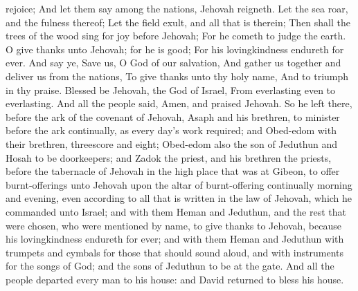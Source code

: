 rejoice; And let them say among the nations, Jehovah reigneth.  Let the sea roar, and the fulness thereof; Let the field exult, and all that is therein;  Then shall the trees of the wood sing for joy before Jehovah; For he cometh to judge the earth.  O give thanks unto Jehovah; for he is good; For his lovingkindness endureth for ever.  And say ye, Save us, O God of our salvation, And gather us together and deliver us from the nations, To give thanks unto thy holy name, And to triumph in thy praise.  Blessed be Jehovah, the God of Israel, From everlasting even to everlasting. And all the people said, Amen, and praised Jehovah.  So he left there, before the ark of the covenant of Jehovah, Asaph and his brethren, to minister before the ark continually, as every day’s work required; and Obed-edom with their brethren, threescore and eight; Obed-edom also the son of Jeduthun and Hosah to be doorkeepers; and Zadok the priest, and his brethren the priests, before the tabernacle of Jehovah in the high place that was at Gibeon, to offer burnt-offerings unto Jehovah upon the altar of burnt-offering continually morning and evening, even according to all that is written in the law of Jehovah, which he commanded unto Israel; and with them Heman and Jeduthun, and the rest that were chosen, who were mentioned by name, to give thanks to Jehovah, because his lovingkindness endureth for ever; and with them Heman and Jeduthun with trumpets and cymbals for those that should sound aloud, and with instruments for the songs of God; and the sons of Jeduthun to be at the gate. And all the people departed every man to his house: and David returned to bless his house. 

